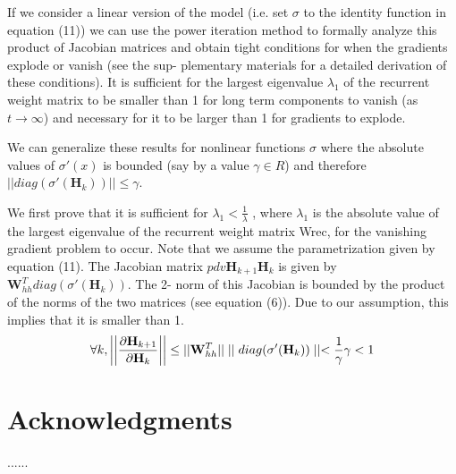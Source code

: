 \documentclass{article}
\begin{document}
If we consider a linear version of the model (i.e. set $\sigma$ to
the identity function in equation (11)) we can use the
power iteration method to formally analyze this product 
of Jacobian matrices and obtain tight conditions
for when the gradients explode or vanish (see the sup-
plementary materials for a detailed derivation of these
conditions). It is sufficient for the largest eigenvalue
$\lambda_1$ of the recurrent weight matrix to be smaller than
1 for long term components to vanish (as $t \rightarrow \infty$) and
necessary for it to be larger than 1 for gradients to
explode.

We can generalize these results for nonlinear functions
$\sigma$ where the absolute values of $\sigma'(x)$ is bounded (say
by a value $\gamma \in R$) and therefore $||diag(\sigma'(\mathbf{H}_k))|| \le \gamma$.

We first prove that it is sufficient for $\lambda_1 < \frac{1}{\lambda}$ , where
$\lambda_1$ is the absolute value of the largest eigenvalue of
the recurrent weight matrix Wrec, for the vanishing
gradient problem to occur. Note that we assume the
parametrization given by equation (11). The Jacobian
matrix $pdv{\mathbf{H}_{k+1}}{\mathbf{H}_k}$ is given by $\mathbf{W}_{hh}^T diag(\sigma'(\mathbf{H}_k))$. The 2-
norm of this Jacobian is bounded by the product of the norms of the two matrices (see equation (6)). Due
to our assumption, this implies that it is smaller than 1.
\begin{equation}
  \forall k, \bigg |\bigg | \pdv{\mathbf{H}_{k+1}}{\mathbf{H}_k} \bigg |\bigg | \le ||\mathbf{W}_{hh}^T||
  \mid\mid diag(\sigma'(\mathbf{H}_k))\mid\mid < \frac{1}{\gamma}\gamma < 1
\end{equation} 

\section*{Acknowledgments}
......
\end{document}
